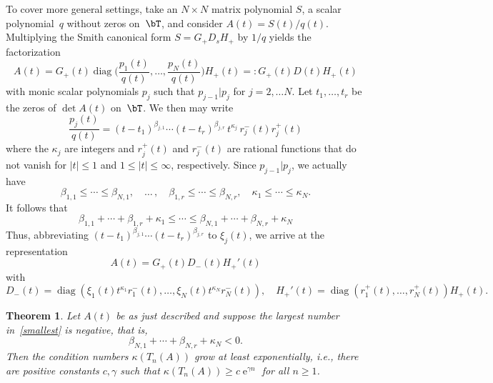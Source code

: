\documentclass[addpoints,12pt,letter]{article}
\DeclareMathOperator{\diag}{diag}
\DeclareMathOperator{\e}{e}
\newcommand{\be}{\beta}
\newcommand{\ga}{\gamma}
\newcommand{\ka}{\kappa}
\newcommand{\nf}{\infty}
\renewcommand{\ge}{\geqslant}
\renewcommand{\le}{\leqslant}
\numberwithin{equation}{section}
\newtheorem{theorem}[lemma]{Theorem}
\theoremstyle{definition}
\begin{document}
To cover more general settings, take an $N \times N$ matrix polynomial $S$, a scalar polynomial~$q$ without zeros on~$\bT$, and consider $A(t)=S(t)/q(t)$.
Multiplying the Smith canonical form $S=G_{+}D_{s}H_{+}$ by $1/q$ yields the factorization
\begin{equation}\label{AS}
A(t)=G_{+}(t)\diag\bigg(\frac{p_{1}(t)}{q(t)}, \ldots, \frac{p_N(t)}{q(t)}
\bigg)H_{+}(t)=:G_{+}(t)D(t)H_{+}(t)
\end{equation}
with monic scalar polynomials $p_{j}$ such that $p_{j-1}|p_{j}$ for $j=2, \ldots N$.
Let $t_{1}, \ldots, t_{r}$ be the zeros of $\det A(t)$ on~$\bT$.
We then may write
\begin{equation}\label{ASj}
\frac{p_{j}(t)}{q(t)}=(t-t_{1})^{\be_{j,1}}\cdots (t-t_{r})^{\be_{j,r}}\,t^{\ka_{j}}\,r_{j}^{-}(t)r_{j}^{+}(t)
\end{equation}
where the $\ka_{j}$ are integers and $r_{j}^{+}(t)$ and $r_{j}^{-}(t)$ are rational functions that do not vanish for $|t|\le 1$ and $1\le|t|\le\nf$, respectively.
Since $p_{j-1}|p_{j}$, we actually have
\[
\be_{1,1}\le\cdots\le\be_{N,1}, \quad \ldots\,, \quad \be_{1,r}\le\cdots\le\be_{N,r},\quad
\ka_{1}\le\cdots\le\ka_N.
\]
It follows that
\begin{equation}\label{smallest}
\be_{1,1}+\cdots+\be_{1,r}+\ka_{1} \le\cdots\le\be_{N,1}+\cdots+\be_{N,r}+\ka_N
\end{equation}
Thus, abbreviating $(t-t_{1})^{\be_{j,1}}\cdots (t-t_{r})^{\be_{j,r}}$ to $\xi_{j}(t)$, we arrive at the representation
\[
A(t)=G_{+}(t)D_{-}(t)H_{+}'(t)
\]
with
\[
D_{-}(t)=\diag (\xi_{1}(t)t^{\ka_{1}}r_{1}^{-}(t), \ldots, \xi_N(t)t^{\ka_N}r_N^{-}(t)),
\quad H_{+}'(t)=\diag (r_{1}^{+}(t), \ldots, r_N^{+}(t))H_{+}(t).
\]

\begin{theorem}\label{th:G1}
Let $A(t)$ be as just described and suppose the largest number in~\eqref{smallest} is negative, that is,
\begin{equation}\label{sm1bis}
\be_{N,1}+\cdots+\be_{N,r}+\ka_N < 0.
\end{equation}
Then the condition numbers $\ka(T_{n}(A))$ grow at least exponentially, i.e., there are positive constants $c,\ga$ such that $\ka(T_{n}(A))\ge c\e^{\ga n}$ for all $n\ge 1$.
\end{theorem}
\end{document}
